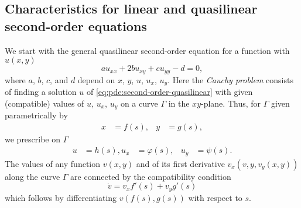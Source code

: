 \subsection{Characteristics for linear and quasilinear second-order equations}
We start with the general quasilinear second-order equation for a function
with \(u(x,y)\)
\begin{equation}
  \label{eq:pde:second-order-quasilinear}
  au_{xx}+2bu_{xy}+cu_{yy}-d=0,
\end{equation}
where \(a\), \(b\), \(c\), and \(d\) depend on \(x\), \(y\), \(u\),
\(u_x\), \(u_y\). Here the \emph{Cauchy problem} consists of finding a
solution \(u\) of \eqref{eq:pde:second-order-quasilinear} with given
(compatible) values of \(u\), \(u_x\), \(u_y\) on a curve \(\Gamma\) in the
\(xy\)-plane. Thus, for \(\Gamma\) given parametrically by
\begin{equation}
  \label{eq:pde:second-order-parametrized-boundary}
    \begin{aligned}
      x&=f(s),&y&=g(s),
    \end{aligned}
\end{equation}
we prescribe on \(\Gamma\)
\begin{equation}
  \label{eq:pde:second-order-boundary-conditions}
    \begin{aligned}
      u&=h(s),u_x&=\varphi(s),&u_y&=\psi(s).
    \end{aligned}
\end{equation}
The values of any function \(v(x,y)\) and of its first derivative
\(v_x(v,y,v_y(x,y))\) along the curve \(\Gamma\) are connected by the
compatibility condition
\[
  \dot v=v_xf'(s)+v_yg'(s)
\]
which follows by differentiating \(v(f(s),g(s))\) with respect to \(s\).

